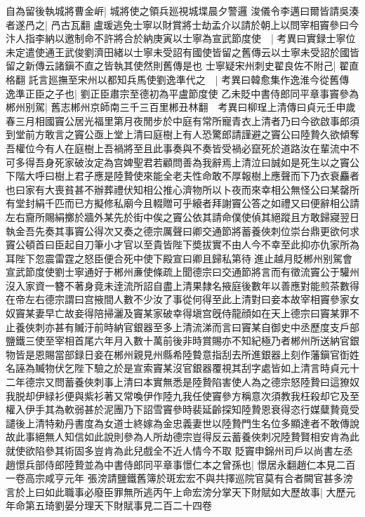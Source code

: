 自為留後執城將曹金㟁|{
	城將使之領兵廵視城堞晨夕警邏}
浚儀令李邁曰爾皆請吳湊者遂冎之|{
	冎古瓦翻}
盧瑗逃免士寧以財賞將士劫孟介以請於朝上以問宰相竇參曰今汴人指李納以邀制命不許將合於納庚寅以士寧為宣武節度使　|{
	考異曰實録士寧位未定遣使通王武俊劉濟田緒以士寧未受詔有國使皆留之舊傳云以士寧未受詔於國皆留之新傳云諸鎭不直之皆執其使然則舊傳是也}
士寧疑宋州刺史翟良佐不附己|{
	翟直格翻}
託言廵撫至宋州以都知兵馬使劉逸準代之　|{
	考異曰韓愈集作逸淮今從舊傳}
逸準正臣之子也|{
	劉正臣肅宗至德初為平盧節度使}
乙未貶中書侍郎同平章事竇參為郴州别駕|{
	舊志郴州京師南三千三百里郴丑林翻　考異曰柳珵上清傳曰貞元壬申歲春三月相國竇公居光福里第月夜閒步於中庭有常所寵青衣上清者乃曰今欲啟事郎須到堂前方敢言之竇公亟上堂上清曰庭樹上有人恐驚郎請謹避之竇公曰陸贄久欲傾奪吾權位今有人在庭樹上吾禍將至且此事奏與不奏皆受禍必竄死於道路汝在輩流中不可多得吾身死家破汝定為宫婢聖君若顧問善為我辭焉上清泣曰誠如是死生以之竇公下階大呼曰樹上君子應是陸贄使來能全老夫性命敢不厚報樹上應聲而下乃衣衰麤者也曰家有大喪貧甚不辦葬禮伏知相公推心濟物所以卜夜而來幸相公無怪公曰某罄所有堂封絹千匹而已方擬修私廟今且輟贈可乎縗者拜謝竇公答之如禮又曰便辭相公請左右齎所賜絹擲於牆外某先於街中俟之竇公依其請命僕使偵其絕蹤且方敢歸寢翌日執金吾先奏其事竇公得次又奏之德宗厲聲曰卿交通節將蓄養俠刺位崇台鼎更欲何求竇公頓首曰臣起自刀筆小才官以至貴皆陛下奬拔實不由人今不幸至此抑亦仇家所為耳陛下忽震雷霆之怒臣便合死中使下殿宣曰卿且歸私第待進止越月貶郴州别駕會宣武節度使劉士寧通好于郴州亷使條疏上聞德宗曰交通節將言而有徵流竇公于驩州沒入家資一簪不著身竟未逹流所詔自盡上清果隸名掖庭後數年以善應對能煎茶數得在帝左右德宗謂曰宫掖間人數不少汝了事從何得至此上清對曰妾本故宰相竇參家女奴竇某妻早亡故妾得陪掃灑及竇某家破幸得塡宫旣侍龍顔如在天上德宗曰竇某罪不止養俠刺亦甚有贓汙前時納官銀器至多上清流涕而言曰竇某自御史中丞歷度支戶部鹽鐵三使至宰相首尾六年月入數十萬前後非時賞賜亦不知紀極乃者郴州所送納官銀物皆是恩賜當部録日妾在郴州親見州縣希陸䞇意指刮去所進銀器上刻作藩鎭官衘姓名誣為贓物伏乞陛下驗之於是宣索竇某沒官銀器覆視其刮字處皆如上清言時貞元十二年德宗又問蓄養俠刺事上清曰本實無悉是陸贄陷害使人為之德宗怒陸贄曰這獠奴我脱却伊緑衫便與紫衫著又常喚伊作陸九我任使竇參方稱意次須教我枉殺却它及至權入伊手其為軟弱甚於泥團乃下詔雪竇參時裴延齡探知陸贄恩衰得恣行媒糵贄竟受譴後上清特勑丹書度為女道士終嫁為金忠義妻世以陸贄門生名位多顯達者不敢傳說故此事絕無人知信如此說則參為人所劫德宗豈得反云蓄養俠刺况陸贄賢相安肯為此就使欲陷參其術固多豈肯為此兒戲全不近人情今不取}
貶竇申錦州司戶以尚書左丞趙憬兵部侍郎陸贄並為中書侍郎同平章事憬仁本之曾孫也|{
	憬居永翻趙仁本見二百一卷高宗咸亨元年}
張滂請鹽鐵舊簿於斑宏宏不與共擇巡院官莫有合者闕官甚多滂言於上曰如此職事必廢臣罪無所逃丙午上命宏滂分掌天下財賦如大歷故事|{
	大歷元年命第五琦劉晏分理天下財賦事見二百二十四卷}
